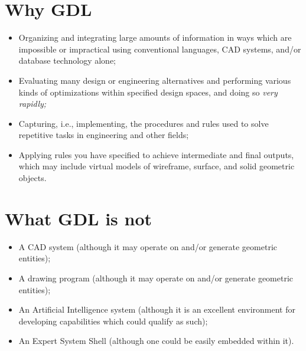 \documentclass [11pt]{book}
\begin{document}
\section{Why GDL}



\begin{itemize}

\item Organizing and integrating large amounts of
information in ways which are impossible or impractical using
conventional languages, CAD systems, and/or database technology
alone;

\item Evaluating many design or engineering alternatives and 
performing various kinds of optimizations within specified design
spaces, and doing so \emph{very rapidly;}

\item Capturing, i.e., implementing, the procedures and rules used
to solve repetitive tasks in engineering and other fields;

\item Applying rules you have specified to achieve intermediate
and final outputs, which may include virtual models of wireframe,
surface, and solid geometric objects.

\end{itemize}



\section{What GDL is not}

\label{sec:whatgdlisnot}



\begin{itemize}

\item A CAD system (although it may operate on and/or generate geometric entities);

\item A drawing program (although it may operate on and/or generate geometric entities);

\item An Artificial Intelligence system (although it is an
excellent environment for developing capabilities which could qualify
as such);

\item An Expert System Shell (although one could be easily embedded within it).

\end{itemize}
\end{document}
